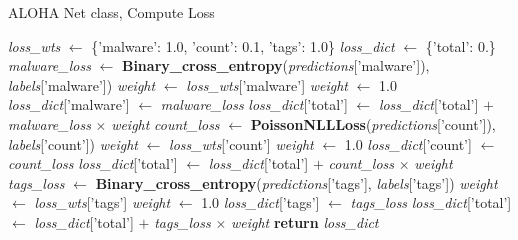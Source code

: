\documentclass[pdfa%
,cucitura%
]{toptesi}
\begin{document}
\begin{algorithm}[h]
	\caption{ALOHA Net class, Compute Loss}\label{alg:alohaNetComputeLoss}
	\begin{algorithmic}[1]
				\State \textit{loss\_wts} $\gets$ \{'malware': 1.0, 'count': 0.1, 'tags': 1.0\}
			\EndIf
			\State
			\State \textit{loss\_dict} $\gets$ \{'total': 0.\}
				\State \textit{malware\_loss} $\gets$ \textbf{Binary\_cross\_entropy}(\textit{predictions}['malware']), \textit{labels}['malware'])
				\State
					\State \textit{weight} $\gets$ \textit{loss\_wts}['malware']
				\Else
					\State \textit{weight} $\gets$ 1.0
				\EndIf
				\State
				\State \textit{loss\_dict}['malware'] $\gets$ \textit{malware\_loss}
				\State \textit{loss\_dict}['total'] $\gets$ \textit{loss\_dict}['total'] $+$ \textit{malware\_loss} $\times$ \textit{weight}
			\EndIf
			\State
				\State \textit{count\_loss} $\gets$ \textbf{PoissonNLLLoss}(\textit{predictions}['count']), \textit{labels}['count'])
				\State
					\State \textit{weight} $\gets$ \textit{loss\_wts}['count']
				\Else
					\State \textit{weight} $\gets$ 1.0
				\EndIf
				\State
				\State \textit{loss\_dict}['count'] $\gets$ \textit{count\_loss}
				\State \textit{loss\_dict}['total'] $\gets$ \textit{loss\_dict}['total'] $+$ \textit{count\_loss} $\times$ \textit{weight}
			\EndIf
			\State
				\State \textit{tags\_loss} $\gets$ \textbf{Binary\_cross\_entropy}(\textit{predictions}['tags'], \textit{labels}['tags'])
				\State
					\State \textit{weight} $\gets$ \textit{loss\_wts}['tags']
				\Else
					\State \textit{weight} $\gets$ 1.0
				\EndIf
				\State
				\State \textit{loss\_dict}['tags'] $\gets$ \textit{tags\_loss}
				\State \textit{loss\_dict}['total'] $\gets$ \textit{loss\_dict}['total'] $+$ \textit{tags\_loss} $\times$ \textit{weight}
			\EndIf
			\State
			\State \textbf{return} \textit{loss\_dict}
		\EndFunction
		\EndClass
	\end{algorithmic}
\end{algorithm}
\end{document}
